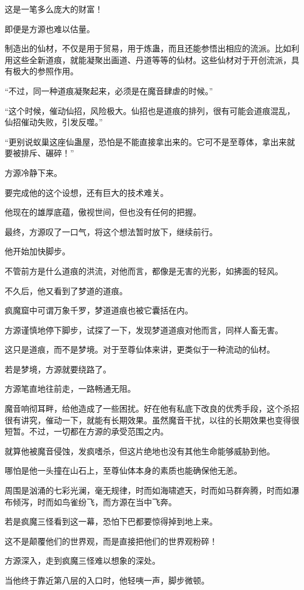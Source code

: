 \begin{this_body}
这是一笔多么庞大的财富！

即便是方源也难以估量。

制造出的仙材，不仅是用于贸易，用于炼蛊，而且还能参悟出相应的流派。比如利用这些全新道痕，就能凝聚出画道、丹道等等的仙材。这些仙材对于开创流派，具有极大的参照作用。

“不过，同一种道痕凝聚起来，必须是在魔音肆虐的时候。”

“这个时候，催动仙招，风险极大。仙招也是道痕的排列，很有可能会道痕混乱，仙招催动失败，引发反噬。”

“更别说蚁巢这座仙蛊屋，恐怕是不能直接拿出来的。它可不是至尊体，拿出来就要被排斥、碾碎！”

方源冷静下来。

要完成他的这个设想，还有巨大的技术难关。

他现在的雄厚底蕴，傲视世间，但也没有任何的把握。

最终，方源叹了一口气，将这个想法暂时放下，继续前行。

他开始加快脚步。

不管前方是什么道痕的洪流，对他而言，都像是无害的光影，如拂面的轻风。

不久后，他又看到了梦道的道痕。

疯魔窟中可谓万象千罗，梦道道痕也被它囊括在内。

方源谨慎地停下脚步，试探了一下，发现梦道道痕对他而言，同样人畜无害。

这只是道痕，而不是梦境。对于至尊仙体来讲，更类似于一种流动的仙材。

若是梦境，方源就要绕路了。

方源笔直地往前走，一路畅通无阻。

魔音响彻耳畔，给他造成了一些困扰。好在他有私底下改良的优秀手段，这个杀招很有讲究，催动一下，就能有长期效果。虽然魔音干扰，以往的长期效果也变得很短暂。不过，一切都在方源的承受范围之内。

就算他被魔音侵蚀，发疯嗜杀，但这片绝地也没有其他生命能够威胁到他。

哪怕是他一头撞在山石上，至尊仙体本身的素质也能确保他无恙。

周围是汹涌的七彩光澜，毫无规律，时而如海啸遮天，时而如马群奔腾，时而如瀑布倾泻，时而如鸟雀纷飞，而方源在当中飞奔。

若是疯魔三怪看到这一幕，恐怕下巴都要惊得掉到地上来。

这不是颠覆他们的世界观，而是直接把他们的世界观粉碎！

方源深入，走到疯魔三怪难以想象的深处。

当他终于靠近第八层的入口时，他轻咦一声，脚步微顿。


\end{this_body}
